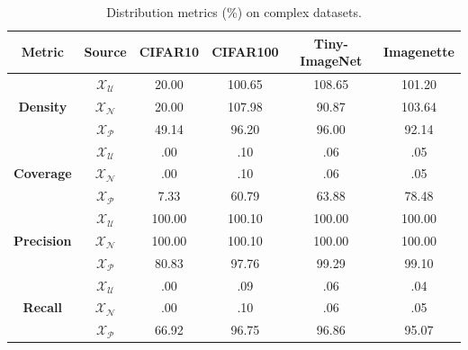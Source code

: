 \begin{table}[H]
    \caption{Distribution metrics (\%) on complex datasets.}
    \label{ch4:tab:abla-embeddings-coverage-objects}
    \centering
    \begin{tabular}{c|c|c|c|c|c}
        \hline  \textbf{Metric} & \textbf{Source} & \textbf{CIFAR10} & \textbf{CIFAR100} & \textbf{Tiny-ImageNet} & \textbf{Imagenette} \\
        \hline
                           & $\mathcal{X}_\mathcal{U}$ & \phantom{0}20.00 &           100.65 &           108.65 &           101.20 \\
        \textbf{Density}   & $\mathcal{X}_\mathcal{N}$ & \phantom{0}20.00 &           107.98 & \phantom{0}90.87 &           103.64 \\
                           & $\mathcal{X}_\mathcal{P}$ & \phantom{0}49.14 & \phantom{0}96.20 & \phantom{0}96.00 & \phantom{0}92.14 \\
        \hline
                           & $\mathcal{X}_\mathcal{U}$ & \phantom{000}.00 & \phantom{000}.10 & \phantom{000}.06 & \phantom{000}.05 \\
        \textbf{Coverage}  & $\mathcal{X}_\mathcal{N}$ & \phantom{000}.00 & \phantom{000}.10 & \phantom{000}.06 & \phantom{000}.05 \\
                           & $\mathcal{X}_\mathcal{P}$ & \phantom{00}7.33 & \phantom{0}60.79 & \phantom{0}63.88 & \phantom{0}78.48 \\
        \hline
                           & $\mathcal{X}_\mathcal{U}$ &           100.00 &           100.10 &           100.00 &           100.00 \\
        \textbf{Precision} & $\mathcal{X}_\mathcal{N}$ &           100.00 &           100.10 &           100.00 &           100.00 \\
                           & $\mathcal{X}_\mathcal{P}$ & \phantom{0}80.83 & \phantom{0}97.76 & \phantom{0}99.29 & \phantom{0}99.10 \\
        \hline
                           & $\mathcal{X}_\mathcal{U}$ & \phantom{000}.00 & \phantom{000}.09 & \phantom{000}.06 & \phantom{000}.04 \\
        \textbf{Recall}    & $\mathcal{X}_\mathcal{N}$ & \phantom{000}.00 & \phantom{000}.10 & \phantom{000}.06 & \phantom{000}.05 \\
                           & $\mathcal{X}_\mathcal{P}$ & \phantom{0}66.92 & \phantom{0}96.75 & \phantom{0}96.86 & \phantom{0}95.07 \\
        \hline
    \end{tabular}
\end{table}

